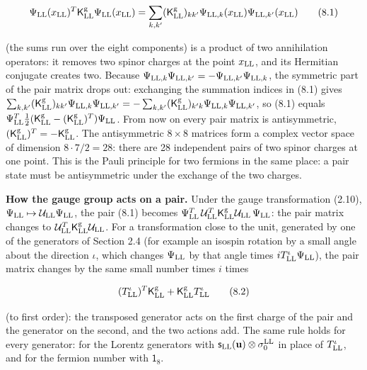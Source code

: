 \documentclass[
  10pt,
]{article}
\begin{document}
\[\Psi_{\rm LL}(x_{\rm LL})^T\mathsf K^{\rm g}_{\rm LL}\Psi_{\rm LL}(x_{\rm LL})=\sum_{k,k'}(\mathsf K^{\rm g}_{\rm LL})_{kk'}\Psi_{{\rm LL},k}(x_{\rm LL})\Psi_{{\rm LL},k'}(x_{\rm LL})\tag{8.1}\]

(the sums run over the eight components) is a product of two
annihilation operators: it removes two spinor charges at the point
\(x_{\rm LL}\), and its Hermitian conjugate creates two. Because
\(\Psi_{{\rm LL},k}\Psi_{{\rm LL},k'}=-\Psi_{{\rm LL},k'}\Psi_{{\rm LL},k}\),
the symmetric part of the pair matrix drops out: exchanging the
summation indices in (8.1) gives
\(\sum_{k,k'}(\mathsf K^{\rm g}_{\rm LL})_{kk'}\Psi_{{\rm LL},k}\Psi_{{\rm LL},k'}=-\sum_{k,k'}(\mathsf K^{\rm g}_{\rm LL})_{k'k}\Psi_{{\rm LL},k}\Psi_{{\rm LL},k'}\),
so (8.1) equals
\(\Psi^T_{\rm LL}\tfrac12(\mathsf K^{\rm g}_{\rm LL}-(\mathsf K^{\rm g}_{\rm LL})^T)\Psi_{\rm LL}\).
From now on every pair matrix is antisymmetric,
\((\mathsf K^{\rm g}_{\rm LL})^T=-\mathsf K^{\rm g}_{\rm LL}\). The
antisymmetric \(8\times8\) matrices form a complex vector space of
dimension \(8\cdot7/2=28\): there are 28 independent pairs of two spinor
charges at one point. This is the Pauli principle for two fermions in
the same place: a pair state must be antisymmetric under the exchange of
the two charges.

\textbf{How the gauge group acts on a pair.} Under the gauge
transformation (2.10),
\(\Psi_{\rm LL}\mapsto\mathcal U_{\rm LL}\Psi_{\rm LL}\), the pair (8.1)
becomes
\(\Psi^T_{\rm LL}\,\mathcal U^T_{\rm LL}\mathsf K^{\rm g}_{\rm LL}\mathcal U_{\rm LL}\,\Psi_{\rm LL}\):
the pair matrix changes to
\(\mathcal U^T_{\rm LL}\mathsf K^{\rm g}_{\rm LL}\mathcal U_{\rm LL}\).
For a transformation close to the unit, generated by one of the
generators of Section 2.4 (for example an isospin rotation by a small
angle about the direction \(\iota\), which changes \(\Psi_{\rm LL}\) by
that angle times \(iT^\iota_{\rm LL}\Psi_{\rm LL}\)), the pair matrix
changes by the same small number times \(i\) times

\[(T^\iota_{\rm LL})^T\mathsf K^{\rm g}_{\rm LL}+\mathsf K^{\rm g}_{\rm LL}T^\iota_{\rm LL}\tag{8.2}\]

(to first order): the transposed generator acts on the first charge of
the pair and the generator on the second, and the two actions add. The
same rule holds for every generator: for the Lorentz generators with
\(\mathsf s_{\rm LL}(\mathbf u)\otimes\sigma^{\rm LL}_0\) in place of
\(T^\iota_{\rm LL}\), and for the fermion number with \(\mathsf 1_8\).
\end{document}
